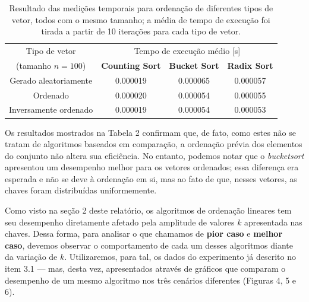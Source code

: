 \documentclass[fontsize=10pt]{article}
\begin{document}
\begin{table}[ht]
\centering
\begin{tabular}{@{}c|ccc@{}}
Tipo de vetor         & \multicolumn{3}{c}{Tempo de execução médio {[}s{]}} \\
(tamanho $n = 100$)   & \textbf{Counting Sort} & \textbf{Bucket Sort} & \textbf{Radix Sort} \\ \midrule
Gerado aleatoriamente & 0.000019               & 0.000065             & 0.000057            \\
Ordenado              & 0.000020               & 0.000054             & 0.000055            \\
Inversamente ordenado & 0.000019               & 0.000054             & 0.000053         
\end{tabular}
\caption{Resultado das medições temporais para ordenação de diferentes tipos de vetor, todos com o mesmo tamanho; a média de tempo de execução foi tirada a partir de 10 iterações para cada tipo de vetor.}
\label{Tabela 3}
\end{table}

\quad Os resultados mostrados na Tabela 2 confirmam que, de fato, como estes não se tratam de algoritmos baseados em comparação, a ordenação prévia dos elementos do conjunto não altera sua eficiência. No entanto, podemos notar que o \textit{bucketsort} apresentou um desempenho melhor para os vetores ordenados; essa diferença era esperada e não se deve à ordenação em si, mas ao fato de que, nesses vetores, as chaves foram distribuídas uniformemente.

\quad Como visto na seção 2 deste relatório, os algoritmos de ordenação lineares tem seu desempenho diretamente afetado pela amplitude de valores $k$ apresentada nas chaves. Dessa forma, para analisar o que chamamos de \textbf{pior caso} e \textbf{melhor caso}, devemos observar o comportamento de cada um desses algoritmos diante da variação de $k$. Utilizaremos, para tal, os dados do experimento já descrito no item 3.1 — mas, desta vez, apresentados através de gráficos que comparam o desempenho de um mesmo algoritmo nos três cenários diferentes (Figuras 4, 5 e 6).
\end{document}
